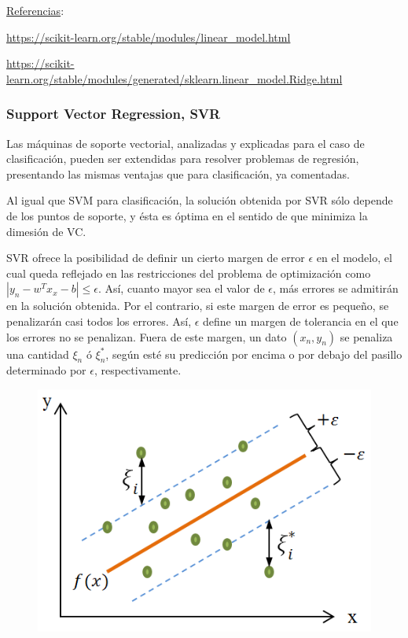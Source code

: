 \documentclass[a4]{article}
\begin{document}
 
\underline{Referencias}:

\href{https://scikit-learn.org/stable/modules/linear_model.html#ridge-regression}{https://scikit-learn.org/stable/modules/linear\_model.html}

\href{https://scikit-learn.org/stable/modules/generated/sklearn.linear_model.Ridge.html}{https://scikit-learn.org/stable/modules/generated/sklearn.linear\_model.Ridge.html}

\subsubsection{Support Vector Regression, SVR}

Las máquinas de soporte vectorial, analizadas y explicadas para el caso de clasificación, pueden ser extendidas para resolver problemas de regresión, presentando las mismas ventajas que para clasificación, ya comentadas. 

Al igual que SVM para clasificación, la solución obtenida por SVR sólo depende de los puntos de soporte, y ésta es óptima en el sentido de que minimiza la dimesión de VC. 

SVR ofrece la posibilidad de definir un cierto margen de error $\epsilon$ en el modelo, el cual queda reflejado en las restricciones del problema de optimización como $|y_n-w^Tx_x-b|\leq \epsilon$. Así, cuanto mayor sea el valor de $\epsilon$, más errores se admitirán en la solución obtenida. Por el contrario, si este margen de error es pequeño, se penalizarán casi todos los errores. Así, $\epsilon$ define un margen de tolerancia en el que los errores no se penalizan. Fuera de este margen, un dato $(x_n,y_n)$ se penaliza una cantidad $\xi_n$ ó $ \xi_n^* $, según esté su predicción por encima o por debajo del pasillo determinado por $\epsilon$, respectivamente. 

\begin{figure}[H]
	\centering
	\includegraphics[width=0.6\linewidth]{img/svr}
	\caption{}
	\label{fig:svr}
\end{figure}
\end{document}
